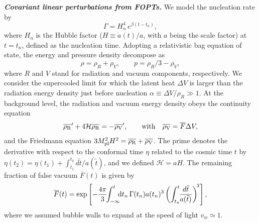 \documentclass[twocolumn,superscriptaddress,aps,preprintnumbers,amsmath,amssymb,prl,footinbib]{revtex4-2}
\newcommand{\td}{{\rm d}}
\begin{document}
\textit{\textbf{ Covariant linear perturbations from FOPTs.}} We model the nucleation rate by
\begin{equation}
\Gamma = H_n^4 \,e^{\beta (t-t_n)},
\end{equation}
where $H_n$ is the Hubble factor ($H\equiv \dot a(t) / a $, with $a$ being the scale factor) at $t=t_n$, defined as the nucleation time.
Adopting a relativistic bag equation of state, the energy and pressure density decompose as
\begin{equation}
\label{eq:rho_p_avg}
\rho=\rho_R+\rho_V,\qquad p=\rho_R/3-\rho_V,
\end{equation}
where $R$ and $V$ stand for radiation and vacuum components, respectively.
We consider the supercooled limit for which the latent heat $\Delta V$ is larger than the radiation energy density just before nucleation $\alpha \equiv \Delta V/\rho_{R} \gg 1$. At the background level, the radiation and vacuum energy density obeys the continuity equation
\begin{align}
\label{eq:bkg_continuity}
\overline{\rho_{\rm R}}'+4\mathcal{H}\overline{\rho_{\rm R}}=-\overline{\rho_{\rm V}}',\qquad \textrm{with}\quad \overline{\rho_{\rm V}} = \overline{F}\Delta V,
\end{align}
and the Friedmann equation $3M_{\rm pl}^2H^2=\overline{\rho_{\rm R}}+\overline{\rho_{\rm V}}$. The prime denotes the derivative with respect to the conformal time $\eta$ related to the cosmic time $t$ by $
\eta(t_2) =\eta(t_1) +\int^{t_2}_{t_1} d\tilde{t}/a(\tilde{t})$, and we defined $\mathcal{H}=aH$.
The remaining fraction of false vacuum $\overline{F}(t) $ is given by
\begin{equation}
\overline{F}(t) = \exp\left[-\frac{4\pi}{3}\!\! \int_{-\infty}^t \!\!\!\td t_n\, \Gamma(t_n) a(t_n)^3 \left(\int_{t_n}^t\!\! \frac{d\tilde{t}}{a(\tilde{t})}\right)^{\!3}\right],
\end{equation}
where we assumed bubble walls to expand at the speed of light $v_w \simeq 1$.
\end{document}
